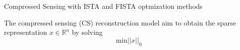 Compressed Sensing with ISTA and FISTA optmization methods

The compressed sensing (CS) reconstruction model aim to obtain the sparse representation $x \in \mathbb{R}^n $ by solving $$ \mathrm{min} ||x||_0 $$
